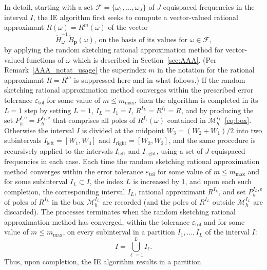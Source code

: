 \documentclass[11pt]{article}
\theoremstyle{plain}
\theoremstyle{remark}
\def \bp{\mathbf{p}}
\begin{document}
In detail, starting with a set
$\mathcal{F} = \{\omega_1, \dots, \omega_J\}$ of $J$ equispaced
frequencies in the interval $I$, the IE algorithm first seeks to
compute a vector-valued rational approximant $R(\omega)= R^m(\omega)$
of the vector
\begin{equation}
\label{eq:tilde_inc_ex}
\mbox{$\widetilde{H}_{\omega}^{-1}\widetilde{B}_\bp(\omega)$, on the basis of its values for $\omega \in \mathcal{F}$,}
\end{equation}
by applying the random sketching
rational approximation method for vector-valued functions of
$\omega$ which is described in Section~\ref{sec:AAA}.  (Per
Remark~\ref{AAA_notat_usage} the superindex $m$ in the notation for
the rational approximant $R = R^m$ is suppressed here and in what
follows.) If the random sketching
rational approximation method converges within the
prescribed error tolerance $\varepsilon_\mathrm{tol}$ for some value
of $m \leq m_\mathrm{max}$, then the algorithm is completed in its
$L=1$ step by setting $L=1$, $I_L = I_1 =I$,
$R^{I_L} = R^{I_1} = R$, and by producing the set
$P_{h}^{I,\mathrm{e}}= P_{h}^{I_1,\mathrm{e}}$ that comprises all
poles of $R^{I_1}(\omega)$ contained in
$\mathcal{M}_h^{I_1}$~\eqref{eq:box}. Otherwise the interval $I$ is
divided at the midpoint $W_3 = (W_2 + W_1) /2$ into two subintervals
$I_\mathrm{left} = [W_1, W_3]$ and $I_\mathrm{right} = [W_3, W_2]$,
and the same procedure is recursively applied to the intervals
$I_\mathrm{left}$ and $I_\mathrm{right}$, using a set of $J$
equispaced frequencies in each case. Each time the random sketching
rational approximation
method converges within the error tolerance $\varepsilon_\mathrm{tol}$
for some value of $m \leq m_\mathrm{max}$ and for some subinterval
$I_L\subset I$, the index $L$ is increased by 1, and upon each such
completion, the corresponding interval $I_L$, rational approximant
$R^{I_L} $, and set $P_{h}^{I_L,\mathrm{e}}$ of poles of $R^{I_L} $ in
the box $\mathcal{M}_h^{I_L}$ are recorded (and the poles of
$R^{I_L} $ outside $\mathcal{M}_h^{I_L}$ are discarded). The processes
terminates when the random sketching
rational approximation method has converged, within the
tolerance $\varepsilon_\mathrm{tol}$ and for some value of
$m \leq m_\mathrm{max}$, on every subinterval in a partition
$I_1,\dots,I_L$ of the interval $I$:
\begin{equation}
  \label{eq:partit}
I=\bigcup_{\ell =1}^L I_\ell.
\end{equation}
Thus, upon completion, the IE algorithm results in a partition
\end{document}
